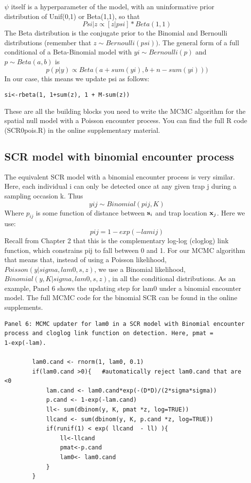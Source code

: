 $\psi$
itself is a hyperparameter of the model, with an uninformative prior distribution of Unif(0,1) or Beta(1,1), so that
\[
Psi|z \propto [z|psi] * Beta(1,1)
\]
The Beta distribution is the conjugate prior to the Binomial and Bernoulli distributions (remember that $z \sim Bernoulli(psi))$. The general form of a full conditional of a Beta-Binomial model with $yi \sim Bernoulli (p) $ and $p \sim Beta(a,b) $ is
\[
p(p|y) \propto Beta(a + sum(yi), b + n-sum(yi)))
\]
In our case, this means we update psi as follows:
\begin{verbatim}
si<-rbeta(1, 1+sum(z), 1 + M-sum(z))
\end{verbatim}

These are all the building blocks you need to write the MCMC algorithm
for the spatial null model with a Poisson encounter process.  You can
find the full R code (SCR0pois.R) in the online supplementary
material.

\subsection{SCR model with binomial encounter process}
The equivalent SCR model with a binomial encounter process is very similar. Here, each individual i can only be detected once at any given trap j during a sampling occasion k.
Thus
\[
yij \sim Binomial (pij, K)
\]
Where $p_{ij}$ is some function of distance between ${\bf s}_{i}$ and trap location ${\bf x}_{j}$. Here we use:
\[
pij=1-exp(-lamij)
\]
Recall from Chapter 2 that this is the complementary log-log (cloglog) link function, which constrains pij to fall between 0 and 1.
For our MCMC algorithm that means that, instead of using a Poisson likelihood, $Poisson(y|sigma,lam0,s,z)$, we use a Binomial likelihood, $Binomial(y,K|sigma,lam0,s,z)$, in all the conditional distributions. As an example, Panel 6 shows the updating step for lam0 under a binomial encounter model. The full MCMC code for the binomial SCR can be found in the online supplements.

{\small
\begin{verbatim}
Panel 6: MCMC updater for lam0 in a SCR model with Binomial encounter
process and cloglog link function on detection. Here, pmat =
1-exp(-lam).

        lam0.cand <- rnorm(1, lam0, 0.1)
        if(lam0.cand >0){   #automatically reject lam0.cand that are <0
            lam.cand <- lam0.cand*exp(-(D*D)/(2*sigma*sigma))
            p.cand <- 1-exp(-lam.cand)
            ll<- sum(dbinom(y, K, pmat *z, log=TRUE))
            llcand <- sum(dbinom(y, K, p.cand *z, log=TRUE))
            if(runif(1) < exp( llcand  - ll) ){
                ll<-llcand
                pmat<-p.cand
                lam0<- lam0.cand
            }
        }
\end{verbatim}
}


